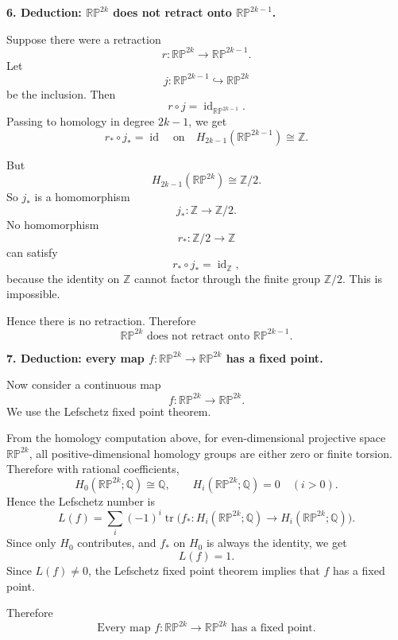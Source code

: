 \documentclass[12pt,a4paper]{article}
\theoremstyle{notespace}
\begin{document}
\medskip

\textbf{6. Deduction: \(\mathbb{RP}^{2k}\) does not retract onto \(\mathbb{RP}^{2k-1}\).}

Suppose there were a retraction
\[
r:\mathbb{RP}^{2k}\to \mathbb{RP}^{2k-1}.
\]
Let
\[
j:\mathbb{RP}^{2k-1}\hookrightarrow \mathbb{RP}^{2k}
\]
be the inclusion. Then
\[
r\circ j=\operatorname{id}_{\mathbb{RP}^{2k-1}}.
\]
Passing to homology in degree \(2k-1\), we get
\[
r_*\circ j_*=\operatorname{id}
\quad\text{on}\quad
H_{2k-1}(\mathbb{RP}^{2k-1})\cong \mathbb Z.
\]

But
\[
H_{2k-1}(\mathbb{RP}^{2k})\cong \mathbb Z/2.
\]
So \(j_*\) is a homomorphism
\[
j_*:\mathbb Z\to \mathbb Z/2.
\]
No homomorphism
\[
r_*:\mathbb Z/2\to \mathbb Z
\]
can satisfy
\[
r_*\circ j_*=\operatorname{id}_{\mathbb Z},
\]
because the identity on \(\mathbb Z\) cannot factor through the finite group \(\mathbb Z/2\). This is impossible.

Hence there is no retraction. Therefore
\[
\boxed{\mathbb{RP}^{2k}\text{ does not retract onto }\mathbb{RP}^{2k-1}.}
\]

\medskip

\textbf{7. Deduction: every map \(f:\mathbb{RP}^{2k}\to \mathbb{RP}^{2k}\) has a fixed point.}

Now consider a continuous map
\[
f:\mathbb{RP}^{2k}\to \mathbb{RP}^{2k}.
\]
We use the Lefschetz fixed point theorem.

From the homology computation above, for even-dimensional projective space \(\mathbb{RP}^{2k}\), all positive-dimensional homology groups are either zero or finite torsion. Therefore with rational coefficients,
\[
H_0(\mathbb{RP}^{2k};\mathbb Q)\cong \mathbb Q,
\qquad
H_i(\mathbb{RP}^{2k};\mathbb Q)=0\quad (i>0).
\]
Hence the Lefschetz number is
\[
L(f)=\sum_i (-1)^i \operatorname{tr}\bigl(f_*:H_i(\mathbb{RP}^{2k};\mathbb Q)\to H_i(\mathbb{RP}^{2k};\mathbb Q)\bigr).
\]
Since only \(H_0\) contributes, and \(f_*\) on \(H_0\) is always the identity, we get
\[
L(f)=1.
\]
Since \(L(f)\neq 0\), the Lefschetz fixed point theorem implies that \(f\) has a fixed point.

Therefore
\[
\boxed{\text{Every map }f:\mathbb{RP}^{2k}\to \mathbb{RP}^{2k}\text{ has a fixed point.}}
\]
\end{document}
